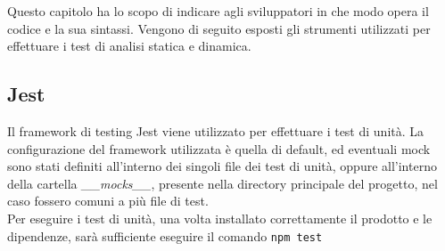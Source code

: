\documentclass[../manuale_sviluppatore.tex]{subfiles}
\begin{document}
Questo capitolo ha lo scopo di indicare agli sviluppatori in che modo opera il codice e la sua sintassi. 
Vengono di seguito esposti gli strumenti utilizzati per effettuare i test di analisi statica e dinamica.

\subsection{Jest}
Il framework di testing Jest viene utilizzato per effettuare i test di unità. La configurazione del 
framework utilizzata è quella di default, ed eventuali mock sono stati definiti all'interno dei singoli 
file dei test di unità, oppure all'interno della cartella \emph{\_\_mocks\_\_}, presente nella 
directory principale del progetto, nel caso fossero comuni a più file di test.\\

Per eseguire i test di unità, una volta installato correttamente il prodotto e le dipendenze, sarà 
sufficiente eseguire il comando \verb|npm test|
\end{document}
